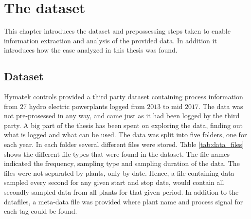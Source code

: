 \chapter{The dataset}\label{cha:data}

This chapter introduces the dataset and prepossessing steps taken to enable information extraction and analysis of the provided data. In addition it introduces how the case analyzed in this thesis was found. 








\section{Dataset}\label{sec:dataset}
    Hymatek controls provided a third party dataset containing process information from $27$ hydro electric powerplants logged from $2013$ to mid $2017$. The data was not pre-prosessed in any way, and came just as it had been logged by the third party. A big part of the thesis has been spent on exploring the data, finding out what is logged and what can be used. The data was split into five folders, one for each year. In each folder several different files were stored. Table \ref{tab:data_files} shows the different file types that were found in the dataset. The file names indicated the frequency, sampling type and sampling duration of the data. The files were not separated by plants, only by date. Hence, a file containing data sampled every second for any given start and stop date, would contain all secondly sampled data from all plants for that given period. In addition to the datafiles, a meta-data file was provided where plant name and process signal for each tag could be found.    
    
